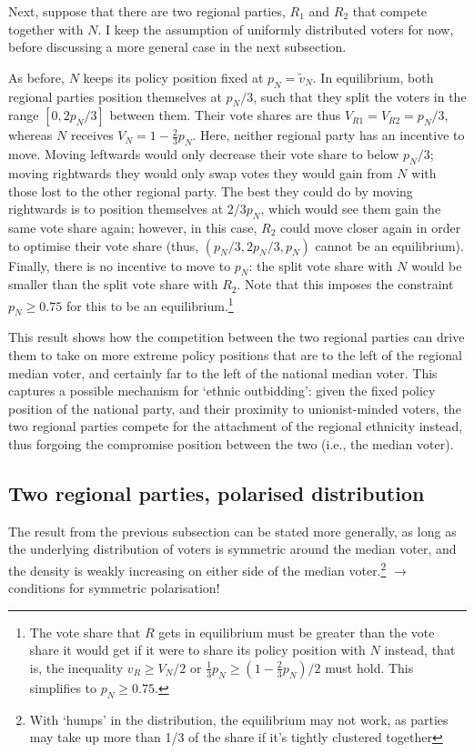 \documentclass[11pt]{article}
\begin{document}
Next, suppose that there are two regional parties, $R_1$ and $R_2$ that compete together with $N$. I keep the assumption of uniformly distributed voters for now, before discussing a more general case in the next subsection.

As before, $N$ keeps its policy position fixed at $p_N = \tilde{v}_N$. In equilibrium, both regional parties position themselves at $p_N / 3$, such that they split the voters in the range $[0, 2 p_N/3]$ between them. Their vote shares are thus $V_{R1} = V_{R2} = p_N / 3$, whereas $N$ receives $V_N = 1 - \frac{2}{3} p_N$. Here, neither regional party has an incentive to move. Moving leftwards would only decrease their vote share to below $p_N / 3$; moving rightwards they would only swap votes they would gain from $N$ with those lost to the other regional party. The best they could do by moving rightwards is to position themselves at $2/3 p_N$, which would see them gain the same vote share again; however, in this case, $R_2$ could move closer again in order to optimise their vote share (thus, $(p_N / 3, 2 p_N/3, p_N) $ cannot be an equilibrium). Finally, there is no incentive to move to $p_N$: the split vote share with $N$ would be smaller than the split vote share with $R_2$. Note that this imposes the constraint $p_N \geq 0.75$ for this to be an equilibrium.\footnote{The vote share that $R$ gets in equilibrium must be greater than the vote share it would get if it were to share its policy position with $N$ instead, that is, the inequality $v_R \geq V_N / 2$ or $\frac{1}{3} p_N \geq (1 - \frac{2}{3} p_N) / 2$ must hold. This simplifies to $p_N \geq 0.75$.}

This result shows how the competition between the two regional parties can drive them to take on more extreme policy positions that are to the left of the regional median voter, and certainly far to the left of the national median voter. This captures a possible mechanism for `ethnic outbidding': given the fixed policy position of the national party, and their proximity to unionist-minded voters, the two regional parties compete for the attachment of the regional ethnicity instead, thus forgoing the compromise position between the two (i.e., the median voter).

\subsection{Two regional parties, polarised distribution}

The result from the previous subsection can be stated more generally, as long as the underlying distribution of voters is symmetric around the median voter, and the density is weakly increasing on either side of the median voter.\footnote{With `humps' in the distribution, the equilibrium may not work, as parties may take up more than 1/3 of the share if it's tightly clustered together} $\rightarrow$ conditions for symmetric polarisation!
\end{document}
